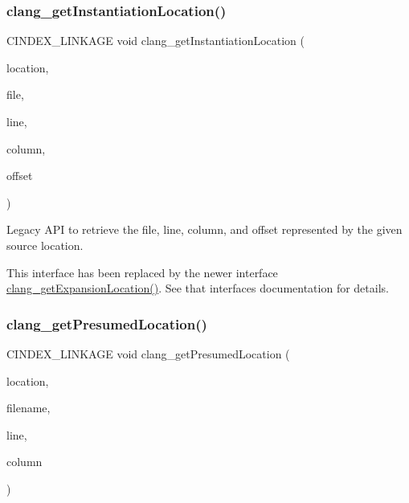 \subsubsection{\texorpdfstring{clang\+\_\+get\+Instantiation\+Location()}{clang\_getInstantiationLocation()}}
{\footnotesize\ttfamily C\+I\+N\+D\+E\+X\+\_\+\+L\+I\+N\+K\+A\+GE void clang\+\_\+get\+Instantiation\+Location (\begin{DoxyParamCaption}\item[{\hyperlink{structCXSourceLocation}{C\+X\+Source\+Location}}]{location,  }\item[{\hyperlink{group__CINDEX__FILES_gacfcea9c1239c916597e2e5b3e109215a}{C\+X\+File} $\ast$}]{file,  }\item[{unsigned $\ast$}]{line,  }\item[{unsigned $\ast$}]{column,  }\item[{unsigned $\ast$}]{offset }\end{DoxyParamCaption})}



Legacy A\+PI to retrieve the file, line, column, and offset represented by the given source location. 

This interface has been replaced by the newer interface \hyperlink{group__CINDEX__LOCATIONS_gadee4bea0fa34550663e869f48550eb1f}{clang\+\_\+get\+Expansion\+Location()}. See that interface\textquotesingle{}s documentation for details. \mbox{\label{group__CINDEX__LOCATIONS_ga03508d9c944feeb3877515a1b08d36f9}} 
\subsubsection{\texorpdfstring{clang\+\_\+get\+Presumed\+Location()}{clang\_getPresumedLocation()}}
{\footnotesize\ttfamily C\+I\+N\+D\+E\+X\+\_\+\+L\+I\+N\+K\+A\+GE void clang\+\_\+get\+Presumed\+Location (\begin{DoxyParamCaption}\item[{\hyperlink{structCXSourceLocation}{C\+X\+Source\+Location}}]{location,  }\item[{\hyperlink{structCXString}{C\+X\+String} $\ast$}]{filename,  }\item[{unsigned $\ast$}]{line,  }\item[{unsigned $\ast$}]{column }\end{DoxyParamCaption})}



